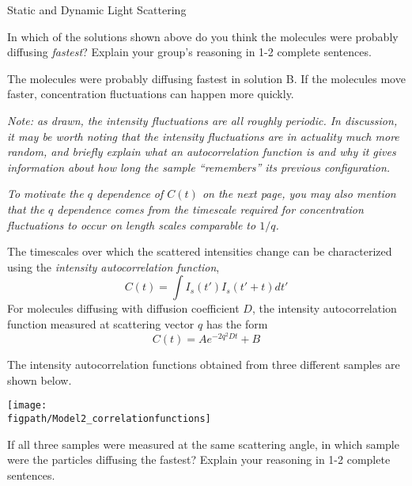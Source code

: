 \begin{activity}{Static and Dynamic Light Scattering}
\begin{ctqs}
	\question In which of the solutions shown above do you think the molecules were probably diffusing \emph{fastest}?  Explain your group's reasoning in 1-2 complete sentences.
	
		\begin{solution}[1.5in]{}
			The molecules were probably diffusing fastest in solution B.  If the molecules move faster, concentration fluctuations can happen more quickly.
			
			\emph{Note: as drawn, the intensity fluctuations are all roughly periodic.  In discussion, it may be worth noting that the intensity fluctuations are in actuality much more random, and briefly explain what an autocorrelation function is and why it gives information about how long the sample ``remembers'' its previous configuration.}
			
			\emph{To motivate the $q$ dependence of $C(t)$ on the next page, you may also mention that the $q$ dependence comes from the timescale required for concentration fluctuations to occur on length scales comparable to $1/q$.}
		\end{solution}
	
\end{ctqs}

\clearpage
\begin{infobox}
	The timescales over which the scattered intensities change can be characterized using the \textit{intensity autocorrelation function},
	\begin{equation*}
		C(t) = \int I_s(t') I_s(t'+t)dt'
	\end{equation*}
	For molecules diffusing with diffusion coefficient $D$, the intensity autocorrelation function measured at scattering vector $q$ has the form
	\begin{equation*}
		C(t) = A e^{-2 q^2 D t} + B
	\end{equation*}
\end{infobox}

\begin{ctqs}
	\question The intensity autocorrelation functions obtained from three different samples are shown below.
	
			\vspace{6pt}
			\centerline{\texttt{[image: \\figpath/Model2\_correlationfunctions]}}	
	
		If all three samples were measured at the same scattering angle, in which sample were the particles diffusing the fastest?  Explain your reasoning in 1-2 complete sentences.
	

\end{ctqs}
\end{activity}
